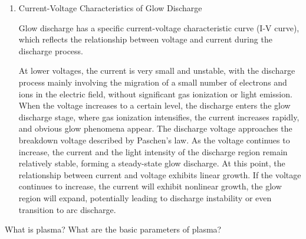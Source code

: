 \begin{enumerate}
	The Faraday Dark Space, located after the cathode glow region. Electrons lose some energy in the cathode glow region, rendering them unable to effectively excite gas molecules to emit light, resulting in a dark state in the Faraday dark space. The electric field intensity decreases, but some ionization still occurs.
	
	The Anode Glow, near the anode region. Electrons are further accelerated near the anode, exciting gas molecules to emit light, forming the anode glow. The electron density is high, and the electric field strength near the anode increases again.
	
	The Anode Dark Space, between the anode glow and the anode. The electric field intensity in this region further weakens, and the electron energy is insufficient to excite gas molecules to emit light, resulting in a dark region. The ion flux density is relatively high, and the recombination effect of electrons and ions near the anode is significant.
	
	\item Current-Voltage Characteristics of Glow Discharge
	
	Glow discharge has a specific current-voltage characteristic curve (I-V curve), which reflects the relationship between voltage and current during the discharge process.
	
	At lower voltages, the current is very small and unstable, with the discharge process mainly involving the migration of a small number of electrons and ions in the electric field, without significant gas ionization or light emission. When the voltage increases to a certain level, the discharge enters the glow discharge stage, where gas ionization intensifies, the current increases rapidly, and obvious glow phenomena appear. The discharge voltage approaches the breakdown voltage described by Paschen's law. As the voltage continues to increase, the current and the light intensity of the discharge region remain relatively stable, forming a steady-state glow discharge. At this point, the relationship between current and voltage exhibits linear growth. If the voltage continues to increase, the current will exhibit nonlinear growth, the glow region will expand, potentially leading to discharge instability or even transition to arc discharge.
\end{enumerate}

\begin{question}
	What is plasma? What are the basic parameters of plasma?
\end{question}

